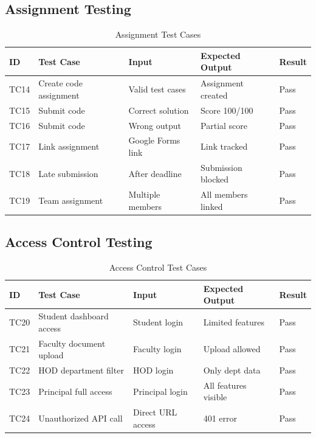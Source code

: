 \subsection{Assignment Testing}

\begin{table}[H]
\centering
\small
\begin{tabular}{|p{1cm}|p{4cm}|p{3cm}|p{3cm}|p{2cm}|}
\hline
\textbf{ID} & \textbf{Test Case} & \textbf{Input} & \textbf{Expected Output} & \textbf{Result} \\
\hline
TC14 & Create code assignment & Valid test cases & Assignment created & Pass \\
\hline
TC15 & Submit code & Correct solution & Score 100/100 & Pass \\
\hline
TC16 & Submit code & Wrong output & Partial score & Pass \\
\hline
TC17 & Link assignment & Google Forms link & Link tracked & Pass \\
\hline
TC18 & Late submission & After deadline & Submission blocked & Pass \\
\hline
TC19 & Team assignment & Multiple members & All members linked & Pass \\
\hline
\end{tabular}
\caption{Assignment Test Cases}
\end{table}

\subsection{Access Control Testing}

\begin{table}[H]
\centering
\small
\begin{tabular}{|p{1cm}|p{4cm}|p{3cm}|p{3cm}|p{2cm}|}
\hline
\textbf{ID} & \textbf{Test Case} & \textbf{Input} & \textbf{Expected Output} & \textbf{Result} \\
\hline
TC20 & Student dashboard access & Student login & Limited features & Pass \\
\hline
TC21 & Faculty document upload & Faculty login & Upload allowed & Pass \\
\hline
TC22 & HOD department filter & HOD login & Only dept data & Pass \\
\hline
TC23 & Principal full access & Principal login & All features visible & Pass \\
\hline
TC24 & Unauthorized API call & Direct URL access & 401 error & Pass \\
\hline
\end{tabular}
\caption{Access Control Test Cases}
\end{table}

